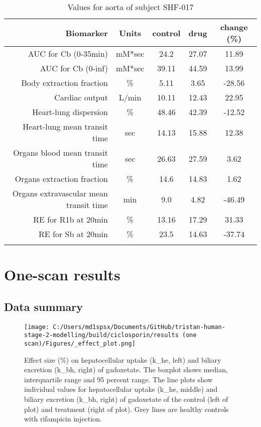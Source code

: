 \documentclass{epflreport}%
\begin{document}
\begin{longtable}{rcccc}%
\hline%
Biomarker&Units&control&drug&change (\%)\\%
\hline%
AUC for Cb (0{-}35min)&mM*sec&24.2&27.07&11.89\\%
AUC for Cb (0{-}inf)&mM*sec&39.11&44.59&13.99\\%
Body extraction fraction&\%&5.11&3.65&{-}28.56\\%
Cardiac output&L/min&10.11&12.43&22.95\\%
Heart{-}lung dispersion&\%&48.46&42.39&{-}12.52\\%
Heart{-}lung mean transit time&sec&14.13&15.88&12.38\\%
Organs blood mean transit time&sec&26.63&27.59&3.62\\%
Organs extraction fraction&\%&14.6&14.83&1.62\\%
Organs extravascular mean transit time&min&9.0&4.82&{-}46.49\\%
RE for R1b at 20min&\%&13.16&17.29&31.33\\%
RE for Sb at 20min&\%&23.5&14.63&{-}37.74\\%
\hline%
\caption{Values for aorta of subject SHF-017} \\%
\end{longtable}%
\clearpage%
\chapter{One{-}scan results}%
\section{Data summary}%
\label{sec:Datasummary}%

%


\begin{figure}[h!]%
\centering%
\texttt{[image: C:/Users/md1spsx/Documents/GitHub/tristan-human-stage-2-modelling/build/ciclosporin/results (one scan)/Figures/\_effect\_plot.png]}%
\caption{Effect size (\%) on hepatocellular uptake (k\_he, left) and biliary excretion (k\_bh, right) of gadoxetate. The boxplot shows median, interquartile range and 95 percent range. The line plots show individual values for hepatocellular uptake (k\_he, middle) and biliary excretion (k\_bh, right) of gadoxetate of the control (left of plot) and treatment (right of plot). Grey lines are healthy controls with rifampicin injection.}%
\end{figure}
\end{document}
